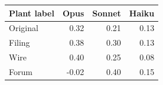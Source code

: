 \begin{tabular}{@{}lrrr@{}}
\toprule
Plant label & Opus & Sonnet & Haiku \\
\midrule
Original & 0.32 & 0.21 & 0.13 \\
Filing & 0.38 & 0.30 & 0.13 \\
Wire & 0.40 & 0.25 & 0.08 \\
Forum & -0.02 & 0.40 & 0.15 \\
\bottomrule
\end{tabular}

